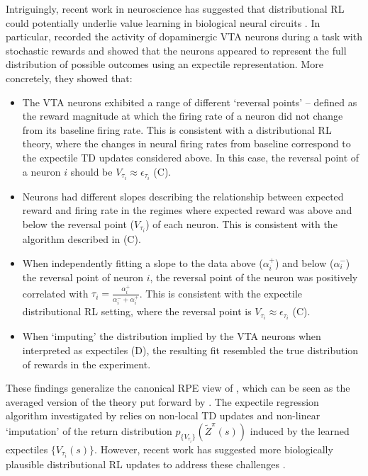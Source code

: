 Intriguingly, recent work in neuroscience has suggested that distributional RL could potentially underlie value learning in biological neural circuits \citep{dabney2020distributional,lowet2020distributional,sousa2023dopamine}.
In particular, \citet{dabney2020distributional} recorded the activity of dopaminergic VTA neurons during a task with stochastic rewards and showed that the neurons appeared to represent the full distribution of possible outcomes using an expectile representation.
More concretely, they showed that:
\begin{itemize}
    \item The VTA neurons exhibited a range of different `reversal points' -- defined as the reward magnitude at which the firing rate of a neuron did not change from its baseline firing rate.
    This is consistent with a distributional RL theory, where the changes in neural firing rates from baseline correspond to the expectile TD updates considered above.
    In this case, the reversal point of a neuron $i$ should be $V_{\tau_i} \approx \epsilon_{\tau_i}$ (C).
    \item Neurons had different slopes describing the relationship between expected reward and firing rate in the regimes where expected reward was above and below the reversal point ($V_{\tau_i}$) of each neuron.
    This is consistent with the algorithm described in  (C).
    \item When independently fitting a slope to the data above ($\alpha_i^+$) and below ($\alpha_i^-$) the reversal point of neuron $i$, the reversal point of the neuron was positively correlated with $\tau_i = \frac{\alpha_i^{+}}{\alpha_i^- + \alpha_i^+}$.
    This is consistent with the expectile distributional RL setting, where the reversal point is $V_{\tau_i} \approx \epsilon_{\tau_i}$ (C).
    \item When `imputing' the distribution implied by the VTA neurons when interpreted as expectiles (D), the resulting fit resembled the true distribution of rewards in the experiment.
\end{itemize}
These findings generalize the canonical RPE view of \citet{schultz1997neural}, which can be seen as the averaged version of the theory put forward by \citet{dabney2020distributional}.
The expectile regression algorithm investigated by \citet{dabney2020distributional} relies on non-local TD updates and non-linear `imputation' of the return distribution $p_{\{ V_{\tau_i} \} }(\tilde{Z}^\pi(s))$ induced by the learned expectiles $\{ V_{\tau_i}(s) \}$. 
However, recent work has suggested more biologically plausible distributional RL updates to address these challenges \citep{tano2020local,wenliang2023distributional}.
